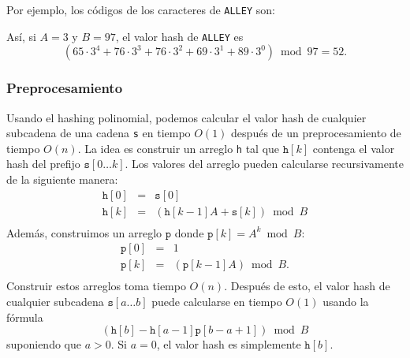 Por ejemplo, los códigos de los caracteres
de \texttt{ALLEY} son:
\begin{center}
\end{center}

Así, si $A=3$ y $B=97$, el valor hash
de \texttt{ALLEY} es
\[(65 \cdot 3^4 + 76 \cdot 3^3 + 76 \cdot 3^2 + 69 \cdot 3^1 + 89 \cdot 3^0) \bmod 97 = 52.\]

\subsubsection*{Preprocesamiento}

Usando el hashing polinomial, podemos calcular el valor hash de cualquier subcadena
de una cadena \texttt{s} en tiempo $O(1)$ después de un preprocesamiento de tiempo $O(n)$.
La idea es construir un arreglo \texttt{h} tal que
$\texttt{h}[k]$ contenga el valor hash del prefijo $\texttt{s}[0 \ldots k]$.
Los valores del arreglo pueden calcularse recursivamente de la siguiente manera:
\[
\begin{array}{lcl}
\texttt{h}[0] & = & \texttt{s}[0] \\
\texttt{h}[k] & = & (\texttt{h}[k-1] A + \texttt{s}[k]) \bmod B \\
\end{array}
\]
Además, construimos un arreglo $\texttt{p}$
donde $\texttt{p}[k]=A^k \bmod B$:
\[
\begin{array}{lcl}
\texttt{p}[0] & = & 1 \\
\texttt{p}[k] & = & (\texttt{p}[k-1] A) \bmod B. \\
\end{array}
\]
Construir estos arreglos toma tiempo $O(n)$.
Después de esto, el valor hash de cualquier subcadena
$\texttt{s}[a \ldots b]$
puede calcularse en tiempo $O(1)$ usando la fórmula
\[(\texttt{h}[b]-\texttt{h}[a-1] \texttt{p}[b-a+1]) \bmod B\]
suponiendo que $a>0$.
Si $a=0$, el valor hash es simplemente $\texttt{h}[b]$.

